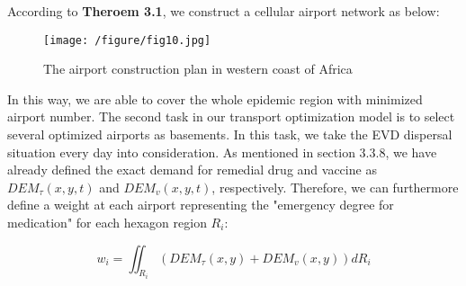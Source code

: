 According to \textbf{Theroem 3.1}, we construct a cellular airport network as below:
\begin{figure}[htbp]
\centering
\texttt{[image: /figure/fig10.jpg]}
\caption{The airport construction plan in western coast of Africa}\label{fig:10}
\end{figure}

In this way, we are able to cover the whole epidemic region with minimized airport number. The second task in our transport optimization model is to select several optimized airports as basements. In this task, we take the EVD dispersal situation every day into consideration. As mentioned in section 3.3.8, we have already defined the exact demand for remedial drug and vaccine as $DEM_{\tau}(x,y,t)$ and $DEM_{v}(x,y,t)$, respectively. Therefore, we can furthermore define a weight at each airport representing the "emergency degree for medication" for each hexagon region $R_{i}$:

\begin{equation}
 w_{i}=\iint_{R_{i}} \left( DEM_{\tau }\left( x,y\right) +DEM_{v}\left( x,y\right) \right) dR_{i}
\end{equation}

